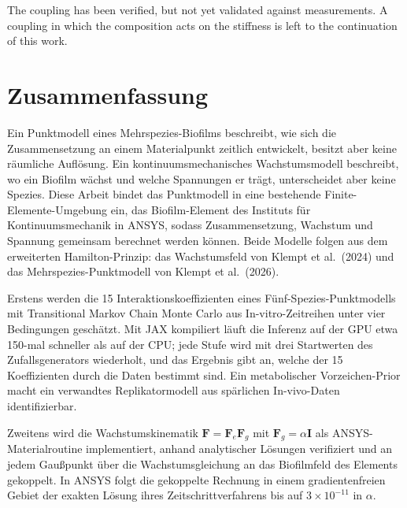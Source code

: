 \documentclass[12pt, a4paper, twoside]{report}
\newcommand{\bF}{\mathbf{F}}
\newcommand{\bI}{\mathbf{I}}
\begin{document}
The coupling has been verified, but not yet validated against measurements. A
coupling in which the composition acts on the stiffness is left to the
continuation of this work.

\iffalse
\newpage
\chapter*{Zusammenfassung}
Ein Punktmodell eines Mehrspezies-Biofilms beschreibt, wie sich die
Zusammensetzung an einem Materialpunkt zeitlich entwickelt, besitzt aber keine
räumliche Auflösung. Ein kontinuumsmechanisches Wachstumsmodell beschreibt, wo
ein Biofilm wächst und welche Spannungen er trägt, unterscheidet aber keine
Spezies. Diese Arbeit bindet das Punktmodell in eine bestehende
Finite-Elemente-Umgebung ein, das Biofilm-Element des Instituts für
Kontinuumsmechanik in ANSYS, sodass Zusammensetzung, Wachstum und Spannung
gemeinsam berechnet werden können. Beide Modelle folgen aus dem erweiterten
Hamilton-Prinzip: das Wachstumsfeld von Klempt et al.\ (2024) und das
Mehrspezies-Punktmodell von Klempt et al.\ (2026).

Erstens werden die 15 Interaktionskoeffizienten eines Fünf-Spezies-Punktmodells
mit Transitional Markov Chain Monte Carlo aus In-vitro-Zeitreihen unter vier
Bedingungen geschätzt. Mit JAX kompiliert läuft die Inferenz auf der GPU etwa
150-mal schneller als auf der CPU; jede Stufe wird mit drei Startwerten des
Zufallsgenerators wiederholt, und das Ergebnis gibt an, welche der 15
Koeffizienten durch die Daten bestimmt sind. Ein metabolischer Vorzeichen-Prior
macht ein verwandtes Replikatormodell aus spärlichen In-vivo-Daten
identifizierbar.

Zweitens wird die Wachstumskinematik $\bF=\bF_e\bF_g$ mit $\bF_g=\alpha\bI$ als
ANSYS-Materialroutine implementiert, anhand analytischer Lösungen verifiziert
und an jedem Gaußpunkt über die Wachstumsgleichung an das Biofilmfeld des
Elements gekoppelt. In ANSYS folgt die gekoppelte Rechnung in einem
gradientenfreien Gebiet der exakten Lösung ihres Zeitschrittverfahrens bis auf
$3\times10^{-11}$ in $\alpha$.
\end{document}
